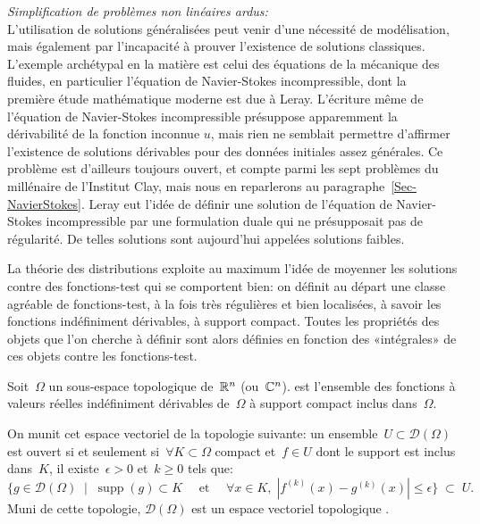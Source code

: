 \begin{histoire}
\medskip
\noindent\emph{Simplification de problèmes non linéaires ardus:}\\[+2.5mm]
L'utilisation de solutions généralisées peut venir d'une nécessité de modélisation, mais également par l'incapacité à prouver l'existence de solutions classiques. L'exemple archétypal en la matière est celui des équations de la mécanique des fluides, en particulier l'équation de Navier-Stokes incompressible, dont la première étude mathématique moderne est due à Leray. L'écriture même de l'équation de Navier-Stokes incompressible présuppose apparemment la dérivabilité de la fonction inconnue $u$, mais rien ne semblait permettre d'affirmer l'existence de solutions dérivables pour des données initiales assez générales. Ce problème est d'ailleurs toujours ouvert, et compte parmi les sept problèmes du millénaire de l'Institut Clay, mais nous en reparlerons au paragraphe~\ref{Sec-NavierStokes}. Leray eut l'idée de définir une solution de l'équation de Navier-Stokes incompressible par une formulation duale qui ne présupposait pas de régularité. De telles solutions sont aujourd'hui appelées solutions faibles.

\medskip
La théorie des distributions exploite au maximum l'idée de moyenner les solutions contre des fonctions-test qui se comportent bien: on définit au départ une classe agréable de fonctions-test, à la fois très régulières et bien localisées, à savoir les fonctions indéfiniment dérivables, à support compact. Toutes les propriétés des objets que l'on cherche à définir sont alors définies en fonction des «intégrales» de ces objets contre les fonctions-test.
\end{histoire}

\medskip
\begin{definition}
Soit~$\Omega$ un sous-espace topologique de~$\mathbb R^n$ (ou~$\mathbb C^n$).
 est l'ensemble des fonctions à valeurs réelles indéfiniment dérivables de~$\Omega$ à support compact inclus dans~$\Omega$.

On munit cet espace vectoriel de la topologie suivante: un ensemble~$U \subset \mathcal{D}(\Omega)$ est ouvert si et seulement si~$\forall K \subset \Omega$ compact et~$f \in U$ dont le support est inclus dans~$K$, il existe~$\epsilon > 0$ et~$k \ge 0$ tels que:
\begin{equation}
  \{ g \in \mathcal{D}(\Omega)\;\mid\; \operatorname{supp}(g) \subset K\quad\text{ et }\quad\forall x \in K,\; |f^{(k)}(x)-g^{(k)}(x)|\le \epsilon \}\;\subset\;U.
\end{equation}
Muni de cette topologie, $\mathcal{D}(\Omega)$ est un espace vectoriel topologique .
\end{definition}


